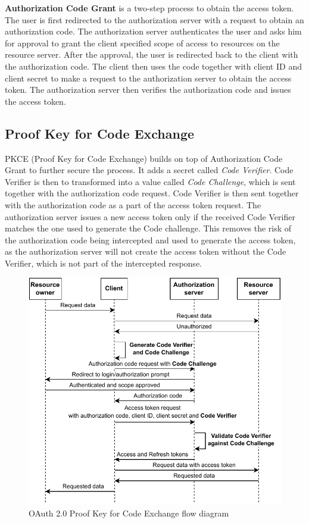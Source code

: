 \textbf{Authorization Code Grant} is a two-step process to obtain the access token. The user is first redirected to the authorization server with a request to obtain an authorization code. The authorization server authenticates the user and asks him for approval to grant the client specified scope of access to resources on the resource server. After the approval, the user is redirected back to the client with the authorization code. The client then uses the code together with client ID and client secret to make a request to the authorization server to obtain the access token. The authorization server then verifies the authorization code and issues the access token.

\subsection*{Proof Key for Code Exchange}
PKCE (Proof Key for Code Exchange) \cite{pkce_rfc} builds on top of Authorization Code Grant to further secure the process. It adds a secret called \emph{Code Verifier}. Code Verifier is then to transformed into a value called \emph{Code Challenge}, which is sent together with the authorization code request. Code Verifier is then sent together with the authorization code as a part of the access token request. The authorization server issues a new access token only if the received Code Verifier matches the one used to generate the Code challenge. This removes the risk of the authorization code being intercepted and used to generate the access token, as the authorization server will not create the access token without the Code Verifier, which is not part of the intercepted response.

\begin{figure}[hbt]
  \centering
  \includegraphics[width=.8 \linewidth]{figures/auth-sequence-pkce.pdf}
  \caption{OAuth 2.0 Proof Key for Code Exchange flow diagram}
  \label{fig:oauth2_pkce}
\end{figure}

